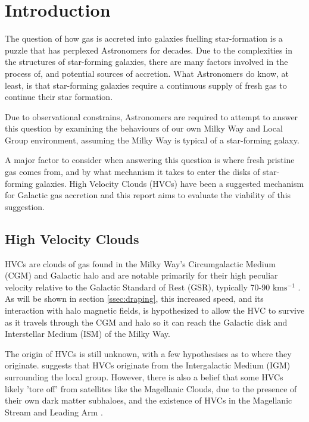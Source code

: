 \chapter{Introduction}
\label{cha:introduction}

The question of how gas is accreted into galaxies fuelling star-formation is a puzzle that has perplexed Astronomers for decades. Due to the complexities in the structures of star-forming galaxies, there are many factors involved in the process of, and potential sources of accretion. What Astronomers do know, at least, is that star-forming galaxies require a continuous supply of fresh gas to continue their star formation.


Due to observational constrains, Astronomers are required to attempt to answer this question by examining the behaviours of our own Milky Way and Local Group environment, assuming the Milky Way is typical of a star-forming galaxy.


A major factor to consider when answering this question is where fresh pristine gas comes from, and by what mechanism it takes to enter the disks of star-forming galaxies. High Velocity Clouds (HVCs) have been a suggested mechanism for Galactic gas accretion and this report aims to evaluate the viability of this suggestion. 


\section{High Velocity Clouds}
\label{sec:hvcs}

HVCs are clouds of gas found in the Milky Way's Circumgalactic Medium (CGM) and Galactic halo and are notable primarily for their high peculiar velocity relative to the Galactic Standard of Rest (GSR), typically 70-90 $\mathrm{km s^{-1}}$ \citep{ID7, ID8, ID66}. As will be shown in section \ref{ssec:draping}, this increased speed, and its interaction with halo magnetic fields, is hypothesized to allow the HVC to survive as it travels through the CGM and halo so it can reach the Galactic disk and Interstellar Medium (ISM) of the Milky Way.


The origin of HVCs is still unknown, with a few hypothesises as to where they originate. \cite{ID66} suggests that HVCs originate from the Intergalactic Medium (IGM) surrounding the local group. However, there is also a belief that some HVCs likely 'tore off' from satellites like the Magellanic Clouds, due to the presence of their own dark matter subhaloes, and the existence of HVCs in the Magellanic Stream and Leading Arm \citep{ID27, ID2}.


